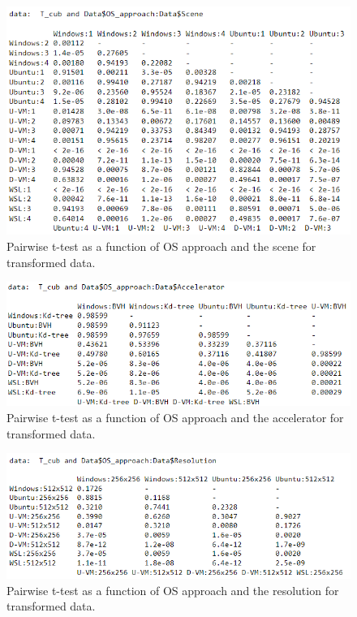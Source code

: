 \documentclass[conference]{IEEEtran}
\begin{document}
\begin{figure}[tb]
    \centering
    \includegraphics[scale=0.4]{figures/ttest2.PNG}
    \caption{Pairwise t-test as a function of OS approach and the scene for transformed data.}
    \label{fig_ttest_2}
\end{figure}




\begin{figure}[tb]
    \centering
    \includegraphics[scale=0.5]{figures/ttest3.PNG}
    \caption{Pairwise t-test as a function of OS approach and the accelerator for transformed data.}
    \label{fig_ttest_3}
\end{figure}




\begin{figure}[tb]
    \centering
    \includegraphics[scale=0.5]{figures/ttest4.PNG}
    \caption{Pairwise t-test as a function of OS approach and the resolution for transformed data.}
    \label{fig_ttest_4}
\end{figure}
\end{document}
